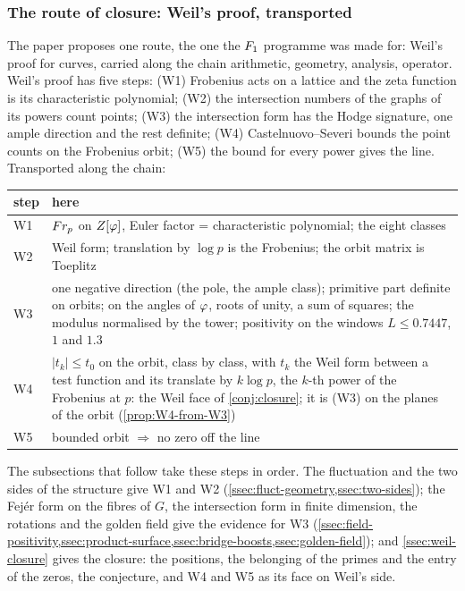\subsubsection{The route of closure: Weil's proof, transported}\label{ssec:route-overview}

The paper proposes one route, the one the $F_1$ programme was made for: Weil's proof for
curves, carried along the chain arithmetic, geometry, analysis, operator.  Weil's proof has five steps: (W1) Frobenius acts on a lattice and the zeta function
is its characteristic polynomial; (W2) the intersection numbers of the graphs of its powers
count points; (W3) the intersection form has the Hodge signature, one ample direction and the
rest definite; (W4) Castelnuovo--Severi bounds the point counts on the Frobenius orbit;
(W5) the bound for every power gives the line.  Transported along the chain:

\begin{center}\small
\begin{tabular}{@{}lp{11.0cm}@{}}
\toprule step & here\\\midrule
W1 & $Fr_p$ on $Z[\varphi]$, Euler factor = characteristic polynomial; the eight classes\\
W2 & Weil form; translation by $\log p$ is the Frobenius; the orbit matrix is Toeplitz\\
W3 & one negative direction (the pole, the ample
class); primitive part definite on orbits; on the angles
of $\varphi$, roots of unity, a sum of squares; the
modulus normalised by the tower; positivity on the
windows $L\le0.7447$, $1$ and $1.3$
\\
W4 & $|t_k|\le t_0$ on the orbit, class by class, with $t_k$ the Weil form between a test function and its translate by $k\log p$, the $k$-th power of the Frobenius at $p$: the Weil face of \cref{conj:closure}; it is \textup{(W3)} on the planes of the orbit (\cref{prop:W4-from-W3})\\
W5 & bounded orbit $\Rightarrow$ no zero off the line\\
\bottomrule\end{tabular}
\end{center}

The subsections that follow take these steps in order.  The fluctuation and the two sides
of the structure give W1 and W2 (\cref{ssec:fluct-geometry,ssec:two-sides}); the Fej\'er form
on the fibres of $G$, the intersection form in finite dimension, the rotations and the golden
field give the evidence for W3 (\cref{ssec:field-positivity,ssec:product-surface,ssec:bridge-boosts,ssec:golden-field});
and \cref{ssec:weil-closure} gives the closure: the positions, the belonging of the primes
and the entry of the zeros, the conjecture, and W4 and W5 as its face on Weil's side.

